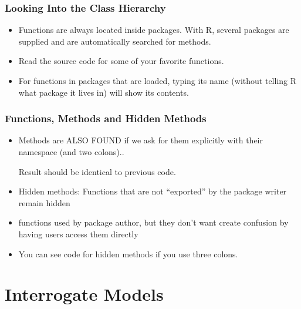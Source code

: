 \documentclass[10pt,english]{beamer}
\begin{document}


\begin{frame}
  \frametitle{Looking Into the Class Hierarchy}
  \begin{itemize}

  \item Functions are always located inside packages.  With R, several
    packages are supplied and are automatically searched for methods.

   \item Read the source code for some of  your favorite functions.



   \item For functions in packages that are loaded, typing its name
   (without telling R what package it lives in) will show its contents.
 \end{itemize}
\end{frame}

\begin{frame}
  \frametitle{Functions, Methods and Hidden Methods}
  \begin{itemize}
  \item Methods are ALSO FOUND if we ask for them explicitly
    with their namespace (and two colons)..


   Result should be identical to previous code.

 \item Hidden methods: Functions that are not ``exported'' by the package writer remain hidden

 \item functions used by package author, but they don't want create
   confusion by having users access them directly

 \item You can see code for hidden methods if you use three colons.


\end{itemize}

\end{frame}


\section{Interrogate Models}
\end{document}
